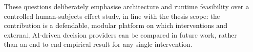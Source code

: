 These questions deliberately emphasise architecture and runtime feasibility over a controlled human-subjects effect study, in line with the thesis scope: the contribution is a defendable, modular platform on which interventions and external, AI-driven decision providers can be compared in future work, rather than an end-to-end empirical result for any single intervention.
